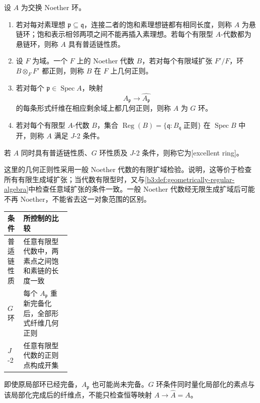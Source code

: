 \begin{definition}\label{b3:def:excellent-ring}
	设 \(A\) 为交换 Noether 环。
	\begin{enumerate}
		\item 若对每对素理想 \(\mathfrak p\subseteq\mathfrak q\)，连接二者的饱和素理想链都有相同长度，则称 \(A\) 为悬链环；饱和表示相邻两项之间不能再插入素理想。若每个有限型 \(A\)-代数都为悬链环，则称 \(A\) 具有普适链性质。
		\item 设 \(F\) 为域。一个 \(F\) 上的 Noether 代数 \(B\)，若对每个有限域扩张 \(F'/F\)，环 \(B\otimes_FF'\) 都正则，则称 \(B\) 在 \(F\) 上几何正则。
		\item 若对每个 \(\mathfrak p\in\operatorname{Spec}A\)，映射
			\[
				A_{\mathfrak p}\longrightarrow\widehat{A_{\mathfrak p}}
			\]
			的每条形式纤维在相应剩余域上都几何正则，则称 \(A\) 为 \(G\) 环。
		\item 若对每个有限型 \(A\)-代数 \(B\)，集合 \(\operatorname{Reg}(B)=\{\mathfrak q:B_{\mathfrak q}\;\text{正则}\}\) 在 \(\operatorname{Spec}B\) 中开，则称 \(A\) 满足 \(J\)-2 条件。
	\end{enumerate}
	若 \(A\) 同时具有普适链性质、\(G\) 环性质及 \(J\)-2 条件，则称它为[excellent ring]。
\end{definition}

这里的几何正则性采用一般 Noether 代数的有限扩域检验。说明，这等价于检查所有有限生成域扩张；当代数有限型时，又与\cref{b3:def:geometrically-regular-algebra}中检查任意域扩张的条件一致。一般 Noether 代数经无限生成扩域后可能不再 Noether，不能省去这一对象范围的区别。

\begin{center}
	\begin{tabularx}{\linewidth}{@{}>{\raggedright\arraybackslash}p{0.25\linewidth}X@{}}
		\toprule
		条件 & 所控制的比较 \\
		\midrule
		普适链性质 & 任意有限型代数中，两素点之间饱和素链的长度一致 \\
		\(G\) 环 & 每个 \(A_{\mathfrak p}\) 重新完备化后，全部形式纤维几何正则 \\
		\(J\)-2 & 任意有限型代数的正则点构成开集 \\
		\bottomrule
	\end{tabularx}
\end{center}
即使原局部环已经完备，\(A_{\mathfrak p}\) 也可能尚未完备。\(G\) 环条件同时量化局部化的素点与该局部化完成后的纤维点，不能只检查恒等映射 \(A\to\widehat A=A\)。

